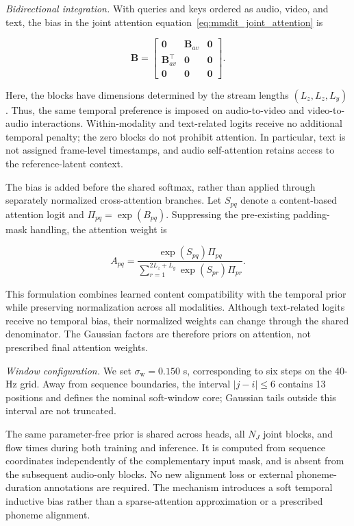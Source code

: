 \textit{Bidirectional integration.} With queries and keys ordered as audio, video, and text, the bias in the joint attention equation~\eqref{eq:mmdit_joint_attention} is

\begin{equation}
\mathbf B=
\begin{bmatrix}
\mathbf 0 & \mathbf B_{av} & \mathbf 0\\
\mathbf B_{av}^{\top} & \mathbf 0 & \mathbf 0\\
\mathbf 0 & \mathbf 0 & \mathbf 0
\end{bmatrix}.
\label{eq:temporal_bias_matrix}
\end{equation}

Here, the blocks have dimensions determined by the stream lengths \((L_z,L_z,L_y)\). Thus, the same temporal preference is imposed on audio-to-video and video-to-audio interactions. Within-modality and text-related logits receive no additional temporal penalty; the zero blocks do not prohibit attention. In particular, text is not assigned frame-level timestamps, and audio self-attention retains access to the reference-latent context.

The bias is added before the shared softmax, rather than applied through separately normalized cross-attention branches. Let \(S_{pq}\) denote a content-based attention logit and \(\Pi_{pq}=\exp(B_{pq})\). Suppressing the pre-existing padding-mask handling, the attention weight is

\begin{equation}
A_{pq}
=
\frac{
\exp(S_{pq})\Pi_{pq}
}{
\displaystyle
\sum_{r=1}^{2L_z+L_y}
\exp(S_{pr})\Pi_{pr}
}.
\label{eq:window_attention_weights}
\end{equation}

This formulation combines learned content compatibility with the temporal prior while preserving normalization across all modalities. Although text-related logits receive no temporal bias, their normalized weights can change through the shared denominator. The Gaussian factors are therefore priors on attention, not prescribed final attention weights.

\textit{Window configuration.} We set \(\sigma_{\mathrm w}=0.150\) s, corresponding to six steps on the 40-Hz grid. Away from sequence boundaries, the interval \(|j-i|\leq6\) contains 13 positions and defines the nominal soft-window core; Gaussian tails outside this interval are not truncated.

The same parameter-free prior is shared across heads, all \(N_J\) joint blocks, and flow times during both training and inference. It is computed from sequence coordinates independently of the complementary input mask, and is absent from the subsequent audio-only blocks. No new alignment loss or external phoneme-duration annotations are required. The mechanism introduces a soft temporal inductive bias rather than a sparse-attention approximation or a prescribed phoneme alignment.
